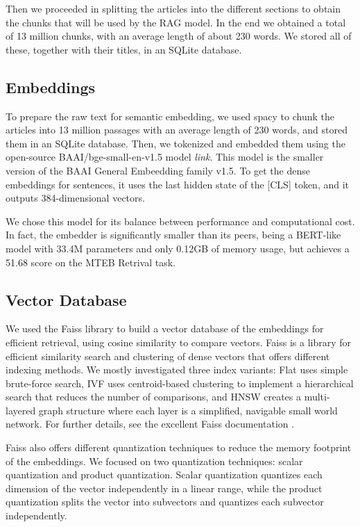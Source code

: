 \documentclass[11pt]{article}
\begin{document}
Then we proceeded in splitting the articles into the different sections to obtain the chunks 
that will be used by the RAG model. 
In the end we obtained a total of 13 million chunks, with an average length of about 230 words.
We stored all of these, together with their titles, in an SQLite database.

\subsection{Embeddings}

To prepare the raw text for semantic embedding, we used spacy to chunk the articles into 13 million passages with an average
length of 230 words, and stored them in an SQLite database. Then, we tokenized and embedded them using the open-source BAAI/bge-small-en-v1.5 model 
\textit{link}. This model is the smaller version of the BAAI General Embeedding family v1.5. 
To get the dense embeddings for sentences, it uses the last hidden state of the [CLS] token, and it outputs 
384-dimensional vectors.

We chose this model for its balance between performance and computational cost.
In fact, the embedder is significantly smaller than its peers, being a BERT-like model with 33.4M 
parameters and only 0.12GB of memory usage, but achieves a 51.68 score on the MTEB Retrival task.

\subsection{Vector Database}

We used the Faiss library to build a vector database of the embeddings for efficient retrieval, using cosine similarity to compare vectors.
Faiss is a library for efficient similarity search and clustering of dense vectors that offers different indexing methods.
We mostly investigated three index variants: Flat uses simple brute-force search, IVF uses centroid-based clustering to 
implement a hierarchical search that reduces the number of comparisons, and HNSW creates a multi-layered graph structure 
where each layer is a simplified, navigable small world network. For further details, see the excellent Faiss documentation \cite{faiss}.

Faiss also offers different quantization techniques to reduce the memory footprint of the embeddings. We focused
on two quantization techniques: scalar quantization and product quantization. 
Scalar quantization quantizes each dimension of the vector independently in a linear
range, while the product quantization splits the vector into subvectors and quantizes each
subvector independently.
\end{document}
